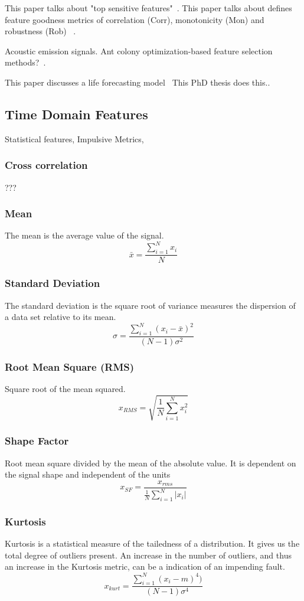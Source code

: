 \documentclass{article}
\begin{document}
This paper talks about "top sensitive features"~\cite{bleakie2013feature}.
This paper talks about defines feature goodness metrics of correlation (Corr), monotonicity (Mon) and robustness (Rob) ~\cite{zhang2016degradation}.

Acoustic emission signals. Ant colony optimization-based feature selection methods?~\cite{liao2010feature}.

This paper discusses a life forecasting model~\cite{wang2016multiple}
This PhD thesis does this..~\cite{martin2017unsupervised}

\subsection{Time Domain Features} 	
Statistical features, Impulsive Metrics, 
\subsubsection{Cross correlation}
???
\subsubsection{Mean}
The mean is the average value of the signal.
$$ \bar{x} = \frac{\sum^N_{i=1} x_i}{N} $$
\subsubsection{Standard Deviation}  
The standard deviation is the square root of variance measures the dispersion of a data set relative to its mean. 
$$ \sigma =\frac{\sum^N_{i=1}(x_i-\bar{x})^2}{(N-1)\sigma^2} $$
\subsubsection{Root Mean Square (RMS)}
Square root of the mean squared.
$$ x_{RMS} = \sqrt{\frac{1}{N} \sum^N_{i=1}x^2_i} $$
\subsubsection{Shape Factor}
Root mean square divided by the mean of the absolute value. It is dependent on the signal shape and independent of the units
$$ x_{SF} = \frac{ x_{rms} }  {\frac{1}{N}\sum^N_{i=1}|x_i|} $$
\subsubsection{Kurtosis}
Kurtosis is a statistical measure of the tailedness of a distribution. It gives us the total degree of outliers present. An increase in the number of outliers, and thus an increase in the Kurtosis metric, can be a indication of an impending fault.
$$ x_{kurt} = \frac{\sum^N_{i=1}(x_i-m)^4)}{(N-1)\sigma^4} $$ 
\end{document}
